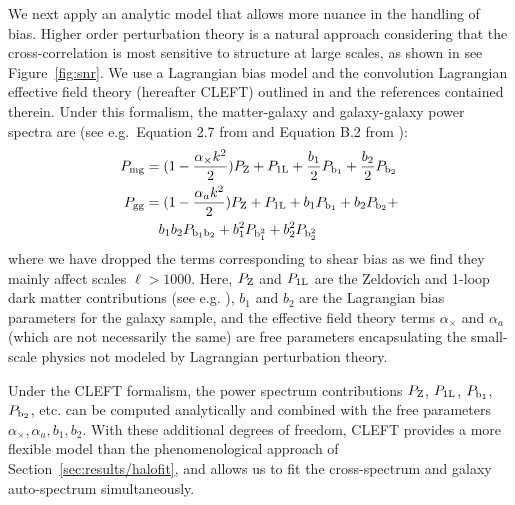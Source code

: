 \documentclass[a4paper,usenatbib]{mnras}
\begin{document}
We next apply an analytic model that allows more nuance in the handling of bias. Higher order perturbation theory is a natural approach considering that the cross-correlation is most sensitive to structure at large scales, as shown in see Figure~\ref{fig:snr}. We use a Lagrangian bias model and the convolution Lagrangian effective field theory (hereafter CLEFT) outlined in \citealt{Vlah++16} and the references contained therein. Under this formalism, the matter-galaxy and galaxy-galaxy power spectra are (see e.g.\ Equation 2.7 from \citealt{Modi++17} and Equation B.2 from \citealt{Vlah++16}):
\begin{align}\label{eqn:lpt1}
    P_{\rm mg} &= (1-\frac{\alpha_{\times}k^2}{2})P_{\rm Z} + P_{\rm 1L} + \frac{b_1}{2}P_{\rm b_1} + \frac{b_2}{2}P_{\rm b_2} \\
    \label{eqn:lpt2}
    P_{\rm gg} &= (1-\frac{\alpha_{a}k^2}{2})P_{\rm Z} + P_{\rm 1L} + b_1 P_{\rm b_1} + b_2 P_{\rm b_2} + \\
    & \hspace{0.35cm} b_1 b_2 P_{\rm b_1 b_2}  + b_1^2 P_{\rm b_1^2} + b_2^2 P_{\rm b_2^2} \nonumber
\end{align}
where we have dropped the terms corresponding to shear bias as we find they mainly affect scales $\ell > 1000$. Here, $P_{\rm Z}$ and $P_{\rm 1L}$ are the Zeldovich and 1-loop dark matter contributions (see e.g. \citealt{Vlah++15}), $b_1$ and $b_2$ are the Lagrangian bias parameters for the galaxy sample, and the effective field theory terms $\alpha_{\times}$ and $\alpha_a$ (which are not necessarily the same) are free parameters encapsulating the small-scale physics not modeled by Lagrangian perturbation theory.

Under the CLEFT formalism, the power spectrum contributions $P_{\rm Z}$, $P_{\rm 1L}$, $P_{\rm b_1}$, $P_{\rm b_2}$, etc. can be computed analytically and combined with the free parameters $\alpha_{\times}, \alpha_a, b_1, b_2$. With these additional degrees of freedom, CLEFT provides a more flexible model than the phenomenological approach of Section~\ref{sec:results/halofit}, and allows us to fit the cross-spectrum and galaxy auto-spectrum simultaneously.
\end{document}
